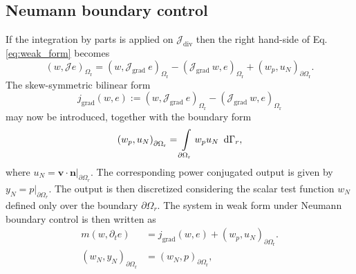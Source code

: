 \documentclass{ifacconf}
\begin{document}
\subsection{Neumann boundary control}
\label{sec:neu_bc}
If the integration by parts is applied on $\mathcal{J}_{\text{div}}$ then the right hand-side of Eq. \eqref{eq:weak_form} becomes
\begin{equation*}
    \left(w, \mathcal{J} e \right)_{\Omega_{\text{r}}} = \left(w, \mathcal{J}_{\text{grad}} \ e \right)_{\Omega_{\text{r}}} - \left(\mathcal{J}_{\text{grad}} \ w, e \right)_{\Omega_{\text{r}}} + \left(w_p, u_N \right)_{\partial \Omega_{\text{r}}}.
\end{equation*}
The skew-symmetric bilinear form 
\[ j_{\text{grad}}(w, e) := \left(w, \mathcal{J}_{\text{grad}} \ e \right)_{\Omega_{\text{r}}} - \left(\mathcal{J}_{\text{grad}} \ w, e \right)_{\Omega_{\text{r}}} \]
may now be introduced, together with the boundary form
\begin{equation}
\label{eq:f_N}
 \left(w_p, u_N \right)_{\partial \Omega_{\text{r}}} = \int_{\partial \Omega_{\text{r}}} w_p u_N \ \d{\Gamma_r},
\end{equation}
where $u_N = \bm{v} \cdot \bm{n} \vert_{\partial \Omega_r}$. The corresponding power conjugated output is given by $y_N = p \vert_{\partial \Omega_r}$. The output is then discretized considering the scalar test function $w_N$ defined only over the boundary $\partial \Omega_r$. The system in weak form under Neumann boundary control is then written as
\begin{equation}
\label{eq:wf_grad}
\begin{aligned}{}
m(w, \partial_t{e}) &= j_{\text{grad}}(w, e) + \left(w_p, u_N \right)_{\partial \Omega_{\text{r}}}. \\
\left(w_N, y_N \right)_{\partial \Omega_{\text{r}}} &= \left(w_N, p \right)_{\partial \Omega_{\text{r}}},
\end{aligned}
\end{equation}
\end{document}
